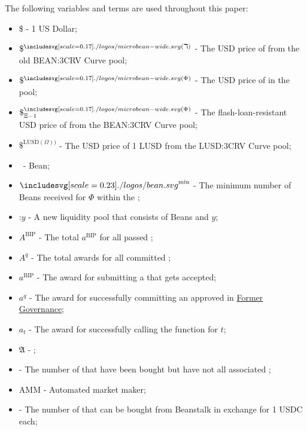 \documentclass[class=article, crop=false]{standalone}
\begin{document}
The following variables and terms are used throughout this paper:
\begin{itemize}[topsep=0pt, itemsep=3pt,leftmargin=16pt]
    \item[] \$ - 1 US Dollar;
    \item[] $\$^{\bean(\daleth)}$ - \hypertarget{ht1a}{The USD price of  from the old BEAN:3CRV Curve pool};
    \item[] $\$^{\bean(\Phi)}$ - \hypertarget{ht2}{The USD price of  in the pool};
    \item[] $\$^{\bean(\Phi)}_{\Xi-1}$ - \hypertarget{ht3}{The flash-loan-resistant USD price of  from the BEAN:3CRV Curve pool};
    \item[] $\$^{\text{LUSD}(\Omega))}$ - \hypertarget{ht4}{The USD price of 1 LUSD from the LUSD:3CRV Curve pool};
    \item[] \Bean\ - Bean;
    \item[] $\Bean^{\text{min}}$ - \hypertarget{ht5}{The minimum number of Beans received for   $\Phi$ within the };
    \item[] \Bean:$y$ - \hypertarget{ht6}{A new liquidity pool that consists of Beans and $y$};
    \item[] $A^{\text{BIP}}$ - \hypertarget{ht7}{The total $a^{\text{BIP}}$ for all passed };
    \item[] $A^q$ - \hypertarget{ht8}{The total awards for all committed };
    \item[] $a^{\text{BIP}}$ - \hypertarget{ht9}{The award for submitting a  that gets accepted};
    \item[] $a^q$ - \hypertarget{ht10}{The award for successfully committing an approved  in \hyperlink{subsection.14.3}{Former Governance}};
    \item[] $a_t$ - \hypertarget{ht11}{The award for successfully calling the  function for $t$};
    \item[] $\mathfrak{A}$ - \hypertarget{ht12}{};
    \item[]  - \hypertarget{ht13}{The number of  that have been bought but have not  all associated };
    \item[] AMM - \hypertarget{ht14}{Automated market maker};
    \item[]  - \hypertarget{ht15}{The number of  that can be bought from Beanstalk in exchange for 1 USDC each};

\end{itemize}
\end{document}
